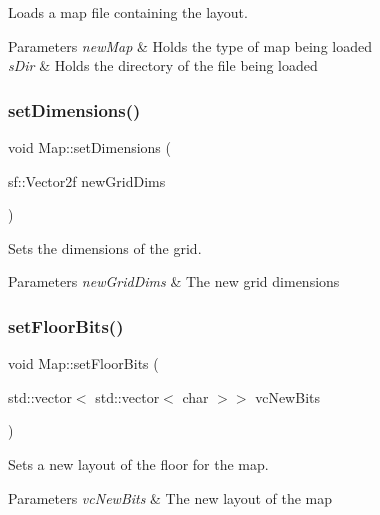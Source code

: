 Loads a map file containing the layout. 


\begin{DoxyParams}{Parameters}
{\em new\+Map} & Holds the type of map being loaded \\
\hline
{\em s\+Dir} & Holds the directory of the file being loaded \\
\hline
\end{DoxyParams}
\mbox{\label{class_map_a24edba47f4b7ce721c7f248564d1dbfd}} 
\subsubsection{\texorpdfstring{set\+Dimensions()}{setDimensions()}}
{\footnotesize\ttfamily void Map\+::set\+Dimensions (\begin{DoxyParamCaption}\item[{sf\+::\+Vector2f}]{new\+Grid\+Dims }\end{DoxyParamCaption})}



Sets the dimensions of the grid. 


\begin{DoxyParams}{Parameters}
{\em new\+Grid\+Dims} & The new grid dimensions \\
\hline
\end{DoxyParams}
\mbox{\label{class_map_afd84034728dd3cdd5dcff4d90366ad4e}} 
\subsubsection{\texorpdfstring{set\+Floor\+Bits()}{setFloorBits()}}
{\footnotesize\ttfamily void Map\+::set\+Floor\+Bits (\begin{DoxyParamCaption}\item[{std\+::vector$<$ std\+::vector$<$ char $>$$>$}]{vc\+New\+Bits }\end{DoxyParamCaption})}



Sets a new layout of the floor for the map. 


\begin{DoxyParams}{Parameters}
{\em vc\+New\+Bits} & The new layout of the map \\
\hline
\end{DoxyParams}
\mbox{\label{class_map_ac55bea6d3f95b4bf871dc2974b50e234}} 

